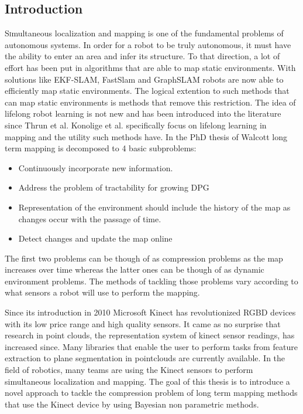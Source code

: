\documentclass[twoside]{article}
\begin{document}
\begin{multicols}{2} %

\section{Introduction}


\lettrine[nindent=0em,lines=3] Simultaneous localization and mapping is one of the fundamental problems of autonomous systems\cite{probRobs}. In order for a robot to be truly autonomous, it must have the ability to enter an area and infer its structure. To that direction, a lot of effort has been put in algorithms that are able to map static environments. With solutions like EKF-SLAM\cite{ekf}, FastSlam\cite{slam} and GraphSLAM\cite{graph} robots are now able to efficiently map static environments. 
The logical extention to such methods that can map  static environments is methods that remove this restriction. The idea of lifelong robot learning is not new and has been introduced into the literature since Thrun et al\cite{liflonglearning}. Konolige et al.\cite{lifelongmaps} specifically focus on lifelong learning in mapping and the utility such methods have.  In the PhD thesis of Walcott long term mapping is decomposed to 4 basic subproblems:
\begin{itemize}
	\item{Continuously incorporate new information.}
	\item{Address the problem of tractability for growing DPG}
	\item{Representation of the environment should include the history of the map as changes occur	with the passage of time.}
	\item{Detect changes and update the map online}
\end{itemize}

The first two problems can be though of as compression problems as the map increases over time whereas the latter ones can be though of as dynamic environment problems. The methods of tackling those problems vary according to what sensors a robot will use to perform the mapping.

Since its introduction in 2010 Microsoft Kinect\cite{kinect} has revolutionized RGBD devices with its low price range and high quality sensors. It came as no surprise that research in point clouds, the representation system of kinect sensor readings, has increased since. Many libraries that enable the user to perform tasks from feature extraction to plane segmentation\cite{pcl} in pointclouds are currently available. In the field of robotics, many teams are using the Kinect sensors to perform simultaneous localization and mapping\cite{rtabmap}. The goal of this thesis is to introduce a novel approach to tackle the compression problem of long term mapping methods that use the Kinect device by using Bayesian non parametric methods.


\end{multicols}
\end{document}

